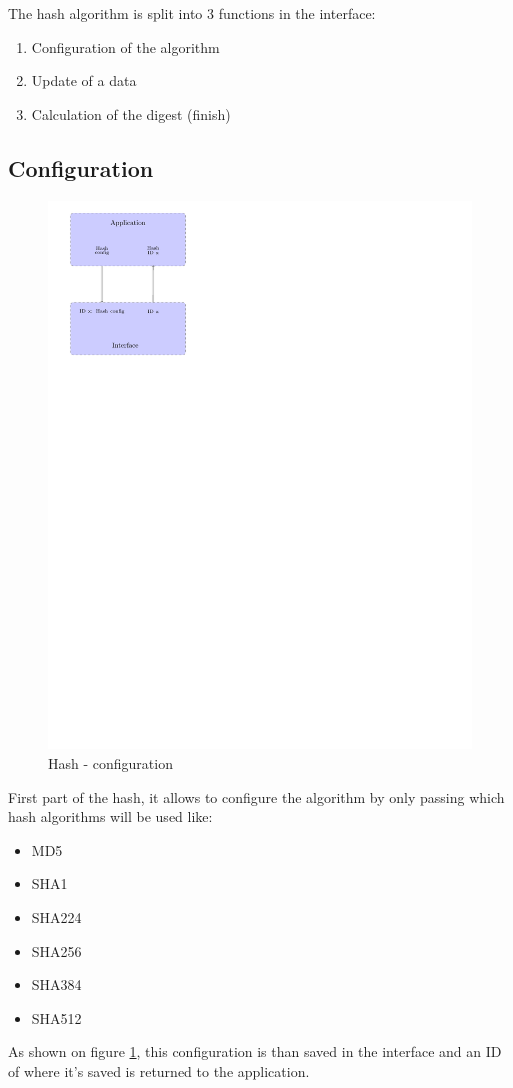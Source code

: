 The hash algorithm is split into 3 functions in the interface:
\begin{enumerate}
  \item Configuration of the algorithm
  \item Update of a data
  \item Calculation of the digest (finish)
  
\end{enumerate}
\subsection*{Configuration}
\begin{figure}[!ht]
\centering
\includegraphics[trim=0cm 20cm 9.5cm 0cm]{figures/hash_example_config.pdf}
\caption{Hash - configuration\newline}
\label{fig:gci_hash_config}
\end{figure}
First part of the hash, it allows to configure the algorithm by only passing
which hash algorithms will be used like:
\begin{itemize}
  \item MD5
  \item SHA1
  \item SHA224
  \item SHA256
  \item SHA384
  \item SHA512
\end{itemize}
As shown on figure \ref{fig:gci_hash_config}, this configuration is than saved
in the interface and an ID of where it's saved is returned to the
application.\newline
\newpage
